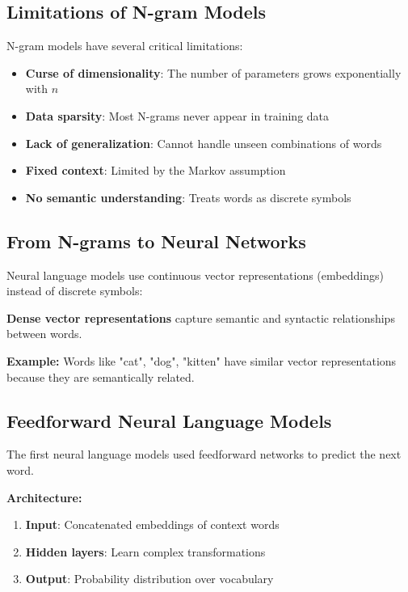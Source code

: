 \documentclass[11pt,a4paper]{article}
\theoremstyle{definition}
\theoremstyle{plain}
\theoremstyle{remark}
\begin{document}
\subsection{Limitations of N-gram Models}

N-gram models have several critical limitations:

\begin{itemize}
    \item \textbf{Curse of dimensionality}: The number of parameters grows exponentially with $n$
    \item \textbf{Data sparsity}: Most N-grams never appear in training data
    \item \textbf{Lack of generalization}: Cannot handle unseen combinations of words
    \item \textbf{Fixed context}: Limited by the Markov assumption
    \item \textbf{No semantic understanding}: Treats words as discrete symbols
\end{itemize}

\subsection{From N-grams to Neural Networks}

Neural language models use continuous vector representations (embeddings) instead of discrete symbols:

\begin{tcolorbox}[colback=blue!5!white,colframe=blue!75!black,title=\textbf{Key Innovation: Word Embeddings}]
\textbf{Dense vector representations} capture semantic and syntactic relationships between words.

\textbf{Example:} Words like "cat", "dog", "kitten" have similar vector representations because they are semantically related.
\end{tcolorbox}

\subsection{Feedforward Neural Language Models}

The first neural language models used feedforward networks to predict the next word.

\textbf{Architecture:}
\begin{enumerate}
    \item \textbf{Input}: Concatenated embeddings of context words
    \item \textbf{Hidden layers}: Learn complex transformations
    \item \textbf{Output}: Probability distribution over vocabulary
\end{enumerate}
\end{document}
